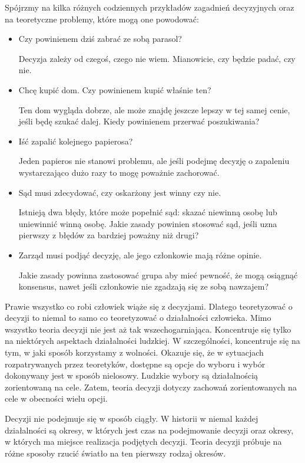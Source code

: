 Spójrzmy na kilka różnych codziennych przykładów zagadnień decyzyjnych oraz na 
teoretyczne problemy, które mogą one powodować:
\begin{itemize}

\item Czy powinienem dziś zabrać ze sobą parasol?

Decyzja zależy od czegoś, czego nie wiem. Mianowicie, czy będzie padać, czy nie.

\item  Chcę kupić dom. Czy powinienem kupić właśnie ten?

Ten dom wygląda dobrze, ale może znajdę jeszcze lepszy w tej samej cenie, jeśli 
będę szukać dalej. Kiedy powinienem przerwać poszukiwania?

\item Iść zapalić kolejnego papierosa?

Jeden papieros nie stanowi problemu, ale jeśli podejmę decyzję o zapaleniu
wystarczająco dużo razy to mogę poważnie zachorować.

\item Sąd musi zdecydować, czy oskarżony jest winny czy nie.

Istnieją dwa błędy, które może popełnić sąd: skazać niewinną osobę lub
uniewinnić winną osobę. Jakie zasady powinien stosować sąd, jeśli uzna pierwszy
z błędów za bardziej poważny niż drugi?

\item Zarząd musi podjąć decyzję, ale jego członkowie mają różne opinie.

Jakie zasady powinna zastosować grupa aby mieć pewność, że mogą osiągnąć
konsensus, nawet jeśli członkowie nie zgadzają się ze sobą nawzajem?

\end{itemize}

Prawie wszystko co robi człowiek wiąże się z decyzjami. Dlatego teoretyzować o 
decyzji to niemal to samo co teoretyzować o działalności człowieka. Mimo 
wszystko teoria decyzji nie jest aż tak wszechogarniająca. Koncentruje się 
tylko na niektórych aspektach działalności ludzkiej. W szczególności, 
koncentruje się na tym, w jaki sposób korzystamy z wolności. Okazuje się, że w 
sytuacjach rozpatrywanych przez teoretyków, dostępne są opcje do wyboru i wybór 
dokonywany jest w sposób nielosowy. Ludzkie wybory są działalnością 
zorientowaną na cele. Zatem, teoria decyzji dotyczy zachowań zorientowanych na 
cele w obecności wielu opcji.

Decyzji nie podejmuje się w sposób ciągły. W historii w niemal każdej 
działalności są okresy, w których jest czas na podejmowanie decyzji oraz 
okresy, w których ma miejsce realizacja podjętych decyzji. Teoria decyzji 
próbuje na różne sposoby rzucić światło na ten pierwszy rodzaj okresów.

